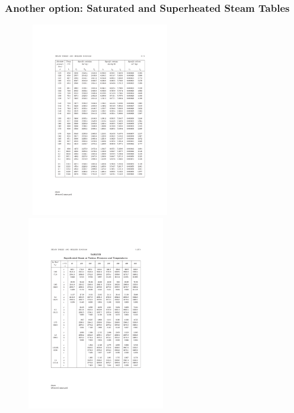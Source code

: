 \documentclass[10pt,compress]{beamer}
\begin{document}
\begin{frame}
  \frametitle{Another option: Saturated and Superheated Steam Tables}
   \begin{figure}%
   \vbox{
      \hbox{\hspace{-1.cm}
      \includegraphics[width=8.cm,height=8.5cm,clip]{./Pics/Sample_SteamTablePg}
      \hspace{-2cm}
      \includegraphics[width=8.cm,height=8.5cm,clip]{./Pics/Sample_SteamTablePg2}}}
   \end{figure}
\end{frame}
\end{document}
